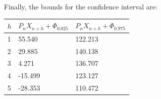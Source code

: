 Finally, the bounds for the confidence interval are:

\begin{table}[H]\centering
    \begin{tabular}{l|ll}
    $h$ & $P_n X_{n+h}+\Phi_{0.025}$ & $P_n X_{n+h}+\Phi_{0.975}$ \\ \hline
    1 & 55.540 & 122.213 \\
    2 & 29.885 & 140.138 \\
    3 & 4.271 & 136.707 \\
    4 & -15.499 & 123.127 \\
    5 & -28.353 & 110.472 \\
    \end{tabular}
\end{table}